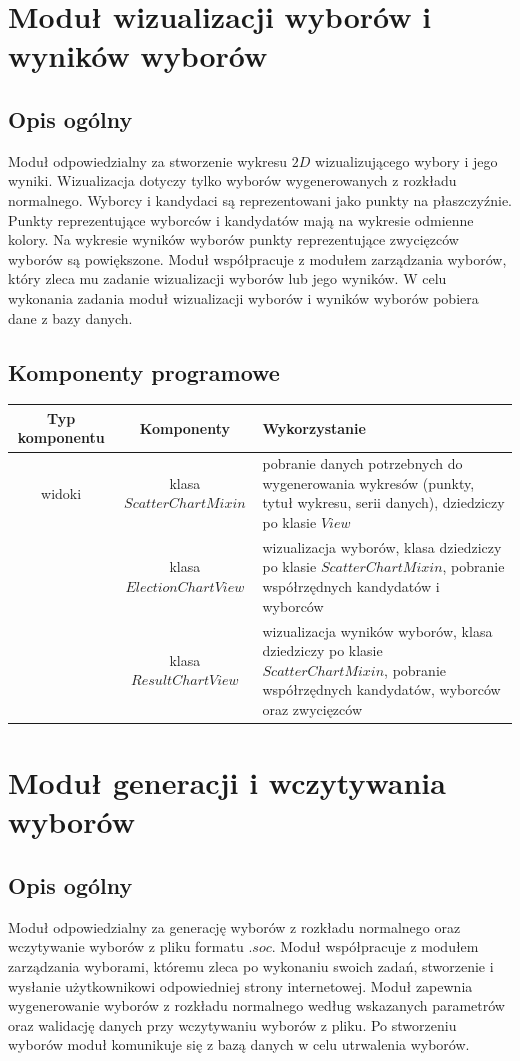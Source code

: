 \documentclass[pdflatex,11pt]{../aghdoc_version2}
\begin{document}
\section{Moduł wizualizacji wyborów i wyników wyborów}
\subsection{Opis ogólny}
Moduł odpowiedzialny za stworzenie wykresu $2D$ wizualizującego wybory i jego wyniki.
Wizualizacja dotyczy tylko wyborów wygenerowanych z rozkładu normalnego. Wyborcy i
kandydaci są reprezentowani jako punkty na płaszczyźnie. Punkty reprezentujące wyborców
i kandydatów mają na wykresie odmienne kolory. Na wykresie wyników wyborów punkty
reprezentujące zwycięzców wyborów są powiększone. Moduł współpracuje z modułem
zarządzania wyborów, który zleca mu zadanie wizualizacji wyborów lub jego wyników. W
celu wykonania zadania moduł wizualizacji wyborów i wyników wyborów pobiera dane z
bazy danych.

\subsection{Komponenty programowe}
\begin{tabular}{|c|c|p{5cm}|}
\hline 
\textbf{Typ komponentu} & \textbf{Komponenty} & \textbf{Wykorzystanie} \\ 
\hline 
widoki & klasa $ScatterChartMixin$ & pobranie danych potrzebnych do
wygenerowania wykresów (punkty, tytuł
wykresu, serii danych), dziedziczy po
klasie $View$ \\ 
\cline{2-3} 
 & klasa $ElectionChartView$ & wizualizacja wyborów, klasa dziedziczy
po klasie $ScatterChartMixin$, pobranie
współrzędnych kandydatów i wyborców \\ 
\cline{2-3} 
 & klasa $ResultChartView$ & wizualizacja wyników wyborów, klasa
dziedziczy po klasie $ScatterChartMixin$,
pobranie współrzędnych kandydatów,
wyborców oraz zwycięzców \\ 
\hline 
\end{tabular} 

\section{Moduł generacji i wczytywania wyborów}
\subsection{Opis ogólny}
Moduł odpowiedzialny za generację wyborów z rozkładu normalnego oraz wczytywanie
wyborów z pliku formatu $.soc$. Moduł współpracuje z modułem zarządzania wyborami,
któremu zleca po wykonaniu swoich zadań, stworzenie i wysłanie użytkownikowi
odpowiedniej strony internetowej. Moduł zapewnia wygenerowanie wyborów z rozkładu normalnego według wskazanych parametrów oraz walidację danych przy wczytywaniu
wyborów z pliku. Po stworzeniu wyborów moduł komunikuje się z bazą danych w celu
utrwalenia wyborów.
\end{document}

